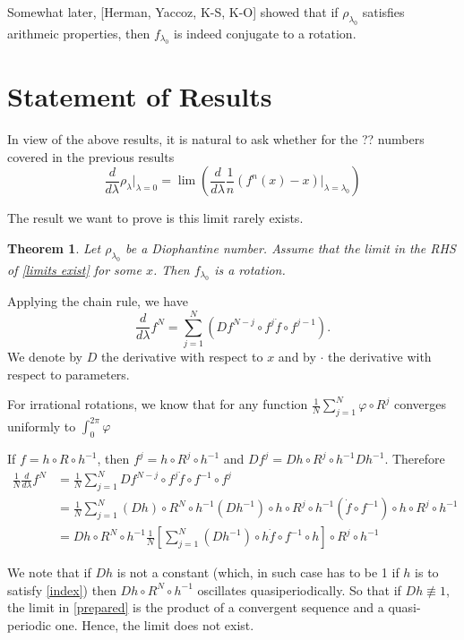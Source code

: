 \documentclass{article}
\newtheorem{theorem}{Theorem}[section]
\begin{document}
Somewhat later, [Herman, Yaccoz, K-S, K-O] showed that if $\rho_{\lambda_0}$ satisfies arithmeic properties, then $f_{\lambda_0}$ is indeed conjugate to a rotation.

\section{Statement of Results}

In view of the above results, it is natural to ask whether for the ?? numbers covered in the previous results 
\begin{equation}
\frac{d}{d\lambda}\rho_\lambda\bigg|_{\lambda=0}=\lim\left(\frac{d}{d\lambda}\frac{1}{n}(f^n(x)-x)\bigg|_{\lambda=\lambda_0}\right)\label{limits exist}
\end{equation}

The result we want to prove is this limit rarely exists.

\begin{theorem}
Let $\rho_{\lambda_0}$ be a Diophantine number. Assume that the limit in the RHS of \eqref{limits exist} for some $x$. Then $f_{\lambda_0}$ is a rotation.
\end{theorem}

Applying the chain rule, we have $$\frac{d}{d\lambda}f^N = \sum_{j=1}^N\left(Df^{N-j}\circ f^j \Dot{f}\circ f^{j-1}\right).$$ We denote by $D$ the derivative with respect to $x$ and by $\cdot$ the derivative with respect to parameters. 

For irrational rotations, we know that for any function $\frac{1}{N}\sum_{j=1}^N\varphi\circ R^j$ converges uniformly to $\int_0^{2\pi}\varphi$

If $f=h\circ R\circ h^{-1}$, then $f^j=h\circ R^j\circ h^{-1}$ and $Df^j=Dh\circ R^j\circ h^{-1}Dh^{-1}$. Therefore \begin{align*}\label{prepared}
    \frac{1}{N}\frac{d}{d\lambda}f^N 
    &= \frac{1}{N}\sum_{j=1}^N Df^{N-j}\circ f^j\Dot{f}\circ f^{-1}\circ f^j\\
    &=\frac{1}{N}\sum_{j=1}^N(Dh)\circ R^N\circ h^{-1}(Dh^{-1})\circ h\circ R^j\circ h^{-1}(\Dot{f}\circ f^{-1})\circ h\circ R^j \circ h^{-1}\\
    &= Dh\circ R^N\circ h^{-1}\frac{1}{N}\left[\sum_{j=1}^N(Dh^{-1})\circ h\Dot{f}\circ f^{-1}\circ h\right]\circ R^j \circ h^{-1}
\end{align*}

We note that if $Dh$ is not a constant (which, in such case has to be 1 if $h$ is to satisfy \eqref{index}) then $Dh\circ R^N\circ h^{-1}$ oscillates quasiperiodically. So that if $Dh\not\equiv1$, the limit in \eqref{prepared} is the product of a convergent sequence and a quasi-periodic one. Hence, the limit does not exist. 
\end{document}
